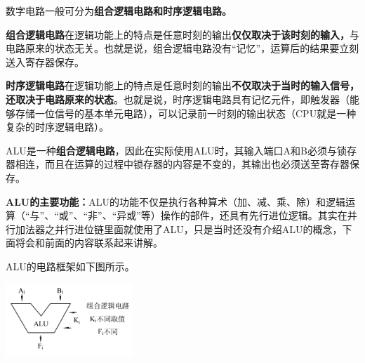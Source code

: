数字电路一般可分为\textbf{{组合逻辑电路和时序逻辑电路。}}

\textbf{组合逻辑电路}在逻辑功能上的特点是任意时刻的输出\textbf{仅仅取决于该时刻的输入，}与电路原来的状态无关。也就是说，组合逻辑电路没有``记忆''，运算后的结果要立刻送入寄存器保存。

\textbf{时序逻辑电路}在逻辑功能上的特点是任意时刻的输出\textbf{不仅取决于当时的输入信号，还取决于电路原来的状态}。也就是说，时序逻辑电路具有记忆元件，即触发器（能够存储一位信号的基本单元电路），可以记录前一时刻的输出状态（CPU就是一种复杂的时序逻辑电路）。

ALU是一种\textbf{组合逻辑电路}，因此在实际使用ALU时，其输入端口A和B必须与锁存器相连，而且在运算的过程中锁存器的内容是不变的，其输出也必须送至寄存器保存。

\textbf{{ALU的主要功能：}}ALU的功能不仅是执行各种算术（加、减、乘、除）和逻辑运算（``与''、``或''、``非''、``异或''等）操作的部件，还具有先行进位逻辑。其实在并行加法器之并行进位链里面就使用了ALU，只是当时还没有介绍ALU的概念，下面将会和前面的内容联系起来讲解。

ALU的电路框架如下图所示。

\includegraphics[width=1.87500in,height=1.09375in]{png-jpeg-pics/CFF08CB305A273F5164B115D7CDD5139.png}
